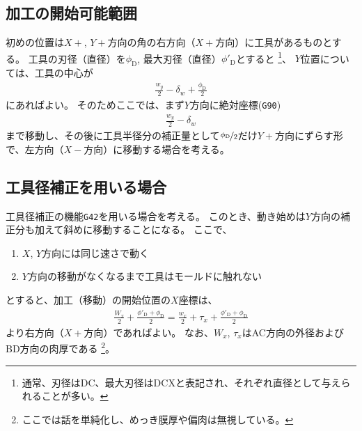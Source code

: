 \subsection{加工の開始可能範囲}
初めの位置は$X+$, $Y+$方向の角の右方向（$X+$方向）に工具があるものとする。
工具の刃径（直径）を$\phi_\mathrm D$, 最大刃径（直径）$\phi'_\mathrm D$とすると
\footnote{通常、刃径はDC、最大刃径はDCXと表記され、それぞれ直径として与えられることが多い。}、
$Y$位置については、工具の中心が
\begin{align}
  \label{eq:tanmenKakouStartY}
  \frac{w_y}2-\delta_w+\frac{\phi_\mathrm D}2
\end{align}
にあればよい。
そのためここでは、まず$Y$方向に絶対座標(\verb|G90|)
\begin{align*}
  \frac{w_y}2-\delta_w
\end{align*}
まで移動し、その後に工具半径分の補正量として$\nicefrac{\phi_\mathrm D}2$だけ$Y+$方向にずらす形で、左方向（$X-$方向）に移動する場合を考える。


\subsection{工具径補正を用いる場合}
工具径補正の機能\verb|G42|を用いる場合を考える。
このとき、動き始めは$Y$方向の補正分も加えて斜めに移動することになる。
ここで、
\begin{enumerate}
\item $X$, $Y$方向には同じ速さで動く
\item $Y$方向の移動がなくなるまで工具はモールドに触れない
\end{enumerate}
とすると、加工（移動）の開始位置の$X$座標は、
\begin{align*}
  \frac{W_x}2+\frac{\phi'_\mathrm D+\phi_\mathrm D}2
  = \frac{w_x}2+\tau_x+\frac{\phi'_\mathrm D+\phi_\mathrm D}2
\end{align*}
より右方向（$X+$方向）であればよい。
なお、$W_x$, $\tau_x$はAC方向の外径およびBD方向の肉厚である
\footnote{ここでは話を単純化し、めっき膜厚や偏肉は無視している。}。


